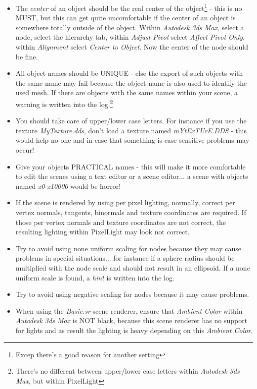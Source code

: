 \begin{itemize}
\item{The \emph{center} of an object should be the real center of the object\footnote{Excep there's a good reason for another setting} - this is no MUST, but this can get quite uncomfortable if the center of an object is somewhere totally outside of the object. Within \emph{Autodesk 3ds Max}, select a node, select the hierarchy tab, within \emph{Adjust Pivot} select \emph{Affect Pivot Only}, within \emph{Alignment} select \emph{Center to Object}. Now the center of the node should be fine.}
\item{All object names should be UNIQUE - else the export of such objects with the same name may fail because the object name is also used to identify the used mesh. If there are objects with the same names within your scene, a warning is written into the log.\footnote{There's no different between upper/lower case letters within \emph{Autodesk 3ds Max}, but within PixelLight}}
\item{You should take care of upper/lower case letters. For instance if you use the texture \emph{MyTexture.dds}, don't load a texture named \emph{mYtExTUrE.DDS} - this would help no one and in case that something is case sensitive problems may occur!}
\item{Give your objects PRACTICAL names - this will make it more comfortable to edit the scenes using a text editor or a scene editor... a scene with objects named \emph{x0}-\emph{x10000} would be horror!}
\item{If the scene is rendered by using per pixel lighting, normally, correct per vertex normals, tangents, binormals and texture coordinates are required. If those per vertex normals and texture coordinates are not correct, the resulting lighting within PixelLight may look not correct.}
\item{Try to avoid using none uniform scaling for nodes because they may cause problems in special situations... for instance if a sphere radius should be multiplied with the node scale and should not result in an ellipsoid. If a none uniform scale is found, a \emph{hint} is written into the log.}
\item{Try to avoid using negative scaling for nodes because it may cause problems.}
\item{When using the \emph{Basic.sr} scene renderer, ensure that \emph{Ambient Color} within \emph{Autodesk 3ds Max} is NOT black, because this scene renderer has no support for lights and as result the lighting is heavy depending on this \emph{Ambient Color}.}
\end{itemize}
